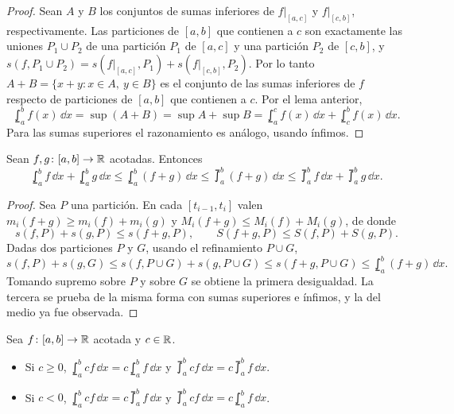 \begin{proof}
  Sean \(A\) y \(B\) los conjuntos de sumas inferiores de \(f|_{[a, c]}\) y \(f|_{[c, b]}\), respectivamente. Las particiones de \([a, b]\) que contienen a \(c\) son exactamente las uniones \(P_1 \cup P_2\) de una partición \(P_1\) de \([a, c]\) y una partición \(P_2\) de \([c, b]\), y \(s(f, P_1 \cup P_2) = s(f|_{[a, c]}, P_1) + s(f|_{[c, b]}, P_2)\). Por lo tanto \(A + B = \{ x + y : x \in A, \ y \in B \}\) es el conjunto de las sumas inferiores de \(f\) respecto de particiones de \([a, b]\) que contienen a \(c\). Por el lema anterior,
  \[
    \lowint_a^b f(x) \,\dd x = \sup(A + B) = \sup A + \sup B = \lowint_a^c f(x) \,\dd x + \lowint_c^b f(x) \,\dd x.
  \]
  Para las sumas superiores el razonamiento es análogo, usando ínfimos.
\end{proof}

\begin{prop}
  Sean \(f, g\colon [a, b] \to \mathbb{R}\) acotadas. Entonces
  \[
    \lowint_a^b f \,\dd x + \lowint_a^b g \,\dd x \leq \lowint_a^b (f + g) \,\dd x \leq \upint_a^b (f + g) \,\dd x \leq \upint_a^b f \,\dd x + \upint_a^b g \,\dd x.
  \]
\end{prop}

\begin{proof}
  Sea \(P\) una partición. En cada \([t_{i-1}, t_i]\) valen \(m_i(f + g) \geq m_i(f) + m_i(g)\) y \(M_i(f + g) \leq M_i(f) + M_i(g)\), de donde
  \[
    s(f, P) + s(g, P) \leq s(f + g, P), \qquad S(f + g, P) \leq S(f, P) + S(g, P).
  \]
  Dadas dos particiones \(P\) y \(G\), usando el refinamiento \(P \cup G\),
  \[
    s(f, P) + s(g, G) \leq s(f, P \cup G) + s(g, P \cup G) \leq s(f + g, P \cup G) \leq \lowint_a^b (f + g) \,\dd x.
  \]
  Tomando supremo sobre \(P\) y sobre \(G\) se obtiene la primera desigualdad. La tercera se prueba de la misma forma con sumas superiores e ínfimos, y la del medio ya fue observada.
\end{proof}

\begin{prop}
  Sea \(f\colon [a, b] \to \mathbb{R}\) acotada y \(c \in \mathbb{R}\).
  \begin{itemize}
    \item Si \(c \geq 0\), \(\lowint_a^b c f \,\dd x = c \lowint_a^b f \,\dd x\) y \(\upint_a^b c f \,\dd x = c \upint_a^b f \,\dd x\).
    \item Si \(c < 0\), \(\lowint_a^b c f \,\dd x = c \upint_a^b f \,\dd x\) y \(\upint_a^b c f \,\dd x = c \lowint_a^b f \,\dd x\).
  \end{itemize}
\end{prop}

